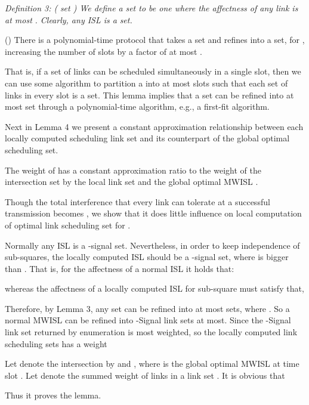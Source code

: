 \documentclass[journal]{IEEEtran}
\begin{document}
\textit{Definition 3: (}\textit{ set \cite{S:phy8}) We define a }\textit{ set to be one where the affectness of any link is at most }\textit{. Clearly, any ISL is a }\textit{ set.}

\begin{lemma}
(\cite{S:phy8}) There is a polynomial-time protocol that takes a  set
and refines into a  set, for , increasing the number of slots by a factor of at
most .
\label{lemma3}
\end{lemma}

That is, if a  set of links can be scheduled simultaneously in a single slot, then we can  use some algorithm to partition a  into  at most  slots such that each set of links in every slot is a  set.
This lemma implies that a  set can be refined into at most   set through a polynomial-time algorithm, e.g., a first-fit algorithm.

Next in Lemma 4 we present a constant approximation relationship
between each locally computed scheduling link set and its counterpart of the global optimal
scheduling set.
\begin{lemma}
The weight of  has a constant approximation ratio to the weight of the intersection set by the local link set  and the global optimal MWISL .
\label{lemma4}
\end{lemma}


\begin{IEEEproof}
Though the total interference that every link  can tolerate at a
successful transmission becomes , we show that
it does little influence on local computation of optimal link scheduling set
for .

Normally any ISL is a -signal set. Nevertheless, in order to keep independence of
sub-squares, the locally computed ISL should be a -signal set, where  is
bigger than . That is, for the affectness of a normal ISL it holds that:

 
whereas the affectness of a locally computed ISL for sub-square must satisfy that,

 


Therefore, by Lemma 3, any  set can be refined into at most
   sets, where . So a normal MWISL
can be refined into   -Signal link sets at most. Since the -Signal
link set returned by enumeration is most weighted, so the locally computed link
scheduling sets  has a weight


Let  denote the intersection by
 and , where  is the global
optimal MWISL at time slot . Let  denote the summed weight of links in
a link set . It is obvious that


Thus it proves the lemma.
\end{IEEEproof}
\end{document}
